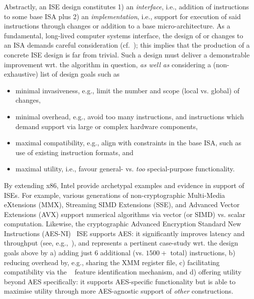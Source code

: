 Abstractly, an ISE design constitutes
1) an {\em interface},
   i.e., 
   addition of instructions to some 
   base ISA
   plus
2) an {\em implementation},
   i.e., 
   support for execution of said instructions through changes or addition 
   to a 
   base micro-architecture.
As a fundamental, long-lived computer systems interface, the design of or
changes to an ISA demands careful consideration
(cf.~\cite[Section 4]{Gueron:09}); this implies that the production of a 
concrete ISE design is far from trivial.  
Such a design must deliver a demonstrable improvement wrt. the algorithm in 
question, {\em as well as} considering a (non-exhaustive) list of design 
goals such as

\begin{itemize}
\item minimal invasiveness,
      e.g.,
      limit the number and scope (local vs. global) of changes,
\item minimal overhead,
      e.g.,
      avoid too many instructions, and instructions which demand support via large or complex hardware components,
\item maximal compatibility,
      e.g.,
      align with constraints in the base ISA, such as use of existing instruction formats,
      and
\item maximal       utility,
      i.e.,
      favour general- vs. {\em too} special-purpose functionality.
\end{itemize}

\noindent
By extending x86, Intel provide archetypal examples and evidence in support 
of ISEs.
For example, various generations of
non-cryptographic
Multi-Media      eXtensions (MMX),
Streaming SIMD  Extensions (SSE),
and
Advanced Vector Extensions (AVX)
support numerical algorithms via vector (or SIMD) vs. scalar computation.  
Likewise, the
    cryptographic
Advanced Encryption Standard New Instructions (AES-NI)~\cite{Gueron:09,DruGueKra:19}
ISE
supports AES: it significantly improves latency and throughput
(see, e.g.,~\cite{FazLopOli:18}),
and represents a pertinent case-study wrt. the design goals above by
a) adding just $6$ additional (vs. $1500+$ total) instructions,
b) reducing overhead by, e.g., sharing the XMM register file,
c) facilitating compatibility via the
   ~\cite[Chapter 20]{X86:1:18}
   feature identification mechanism,
   and
d) offering utility beyond AES specifically:
   it supports AES-specific functionality but is able to maximise utility 
   through more AES-agnostic support of {\em other} constructions.

